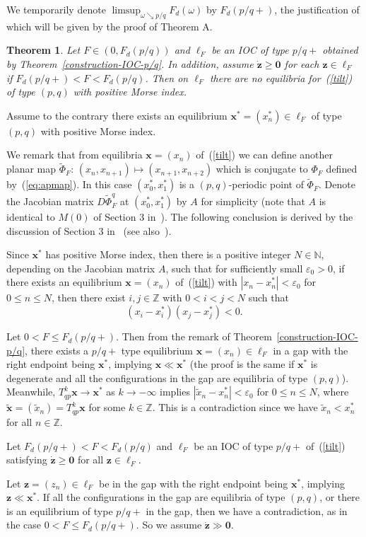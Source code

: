 \documentclass[12pt]{article}
\newcommand{\Z}{\mathbb{Z}}
\newcommand{\N}{\mathbb{N}}
\newcommand{\eps}{\varepsilon}
\newcounter{number}
\newtheorem{theorem}{Theorem}
\newcommand{\begth}{\begin{theorem}\hspace{1em}}
\newcommand{\eeth}{\end{theorem}
   \addtocounter{number}{1}}
\newcommand{\refer}[1]{~(\ref{#1})}
\newcommand{\zbf}{{\mathbf{z}}}
\newcommand{\xbf}{{\mathbf{x}}}
\newcommand{\zero}{{\mathbf{0}}}
\newcommand{\pf}{{\bf Proof:}\hspace{1em}}
\begin{document}
We temporarily denote $\limsup_{\omega\searrow p/q}F_d(\omega)$ by $F_d(p/q+)$, the justification of which will be given by the proof of Theorem A.

\begth\label{positive-index}
Let $F\in (0, F_d(p/q))$ and $\ell_F$ be an IOC  of type $p/q+$ obtained by Theorem~\ref{construction-IOC-p/q}. In addition, assume $\dot{\zbf}\geq\zero$ for each $\zbf\in\ell_F$ if $F_d(p/q+)<F<F_d(p/q)$. Then on $\ell_F$ there are no  equilibria for\refer{tilt} of type $(p,q)$ with positive Morse index.
\eeth
\noindent \pf
Assume to the contrary there exists an equilibrium $\xbf^*=(x_n^*)\in\ell_F$ of type $(p,q)$ with positive Morse index.

We remark that from equilibria $\xbf=(x_n)$ of\refer{tilt} we can define another planar map $\tilde{\Phi}_F$: $(x_n,x_{n+1})\mapsto (x_{n+1},x_{n+2})$ which is conjugate to $\Phi_F$ defined by\refer{eq:apmap}. In this case $(x_0^*,x_1^*)$ is a $(p,q)$-periodic point of $\tilde{\Phi}_F$. Denote the Jacobian matrix $D\tilde{\Phi}_F^q$ at $(x_0^*,x_1^*)$ by $A$ for simplicity (note that $A$ is identical to $M(0)$ of Section 3 in~\cite{An1}). The following conclusion is derived by the discussion of Section 3 in~\cite{An1} (see also~\cite{MM}).

Since $\xbf^*$ has positive Morse index, then there is a positive integer $N\in\N$, depending on the Jacobian matrix $A$, such that for sufficiently small $\eps_0>0$, if there exists an equilibrium $\xbf=(x_n)$ of\refer{tilt} with $|x_n-x_n^*|<\eps_0$ for $0\leq n\leq N$, then there exist $i,j\in\Z$ with $0<i<j<N$ such that
$$
(x_i-x_i^*)(x_j-x_j^*)<0.
$$

Let $0<F\leq F_d(p/q+)$. Then from the remark of Theorem~\ref{construction-IOC-p/q}, there exists a $p/q+$ type equilibrium $\xbf=(x_n)\in\ell_F$ in a gap with the right endpoint being $\xbf^*$, implying $\xbf\ll\xbf^*$ (the proof is the same if $\xbf^*$ is degenerate and all the configurations in the gap are equilibria of type $(p,q)$). Meanwhile, $T_{qp}^k\xbf\to\xbf^*$ as $k\to -\infty$ implies $|\tilde{x}_n-x_n^*|<\eps_0$ for $0\leq n\leq N$, where $\tilde{\xbf}=(\tilde{x}_n)=T_{qp}^k\xbf$ for some $k\in\Z$. This is a contradiction since we have $\tilde{x}_n<x_n^*$ for all $n\in\Z$.

Let $F_d(p/q+)<F<F_d(p/q)$ and $\ell_F$ be an IOC of type $p/q+$ of\refer{tilt} satisfying $\dot{\zbf}\geq \zero$ for all $\zbf\in\ell_F$.

Let $\zbf=(z_n)\in\ell_F$ be in the gap with the right endpoint being $\xbf^*$, implying $\zbf\ll\xbf^*$. If all the configurations in the gap are equilibria of type $(p,q)$, or there is  an equilibrium of type $p/q+$ in the gap,  then we have a contradiction, as in the case $0<F\leq F_d(p/q+)$. So we assume $\dot{\zbf}\gg\zero$.
\end{document}
